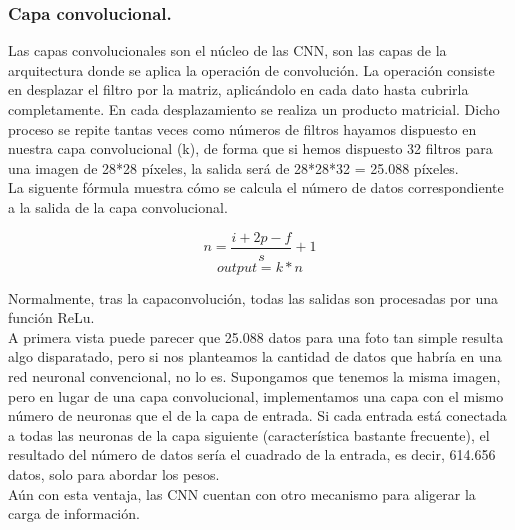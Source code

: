 \documentclass[a4paper,10pt]{article}
\begin{document}
\subsubsection{Capa convolucional.}
Las capas convolucionales son el núcleo de las CNN, son las capas de la arquitectura donde se aplica la operación de convolución. La operación consiste en desplazar el filtro por la matriz, aplicándolo en cada dato hasta cubrirla completamente. En cada desplazamiento se realiza un producto matricial. Dicho proceso se repite tantas veces como números de filtros hayamos dispuesto en nuestra capa convolucional (k), de forma que si hemos dispuesto 32 filtros para una imagen de 28*28 píxeles, la salida será de 28*28*32 = 25.088 píxeles.
 \\La siguente fórmula muestra cómo se calcula el número de datos correspondiente a la salida de la capa convolucional.

\[
n=\frac{i+2p-f}{s}  +1
\]
\[
output = k * n
\]

Normalmente, tras la capaconvolución, todas las salidas son procesadas por una función ReLu.\\
A primera vista puede parecer que 25.088 datos para una foto tan simple resulta algo disparatado, pero si nos planteamos la cantidad de datos que habría en una red neuronal convencional, no lo es. Supongamos que tenemos la misma imagen, pero en lugar de una capa convolucional, implementamos una capa con el mismo número de neuronas que el de la capa de entrada. Si cada entrada está conectada a todas las neuronas de la capa siguiente (característica bastante frecuente), el resultado del número de datos sería el cuadrado de la entrada, es decir, 614.656 datos, solo para abordar los pesos. \\
Aún con esta ventaja, las CNN cuentan con otro mecanismo para aligerar la carga de información.
\end{document}

